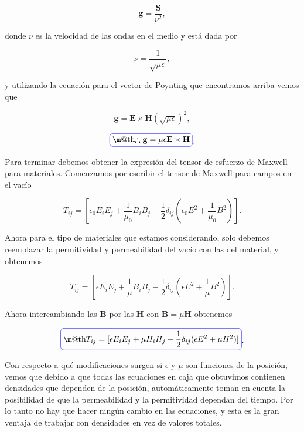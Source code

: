 \documentclass[a4paper,11pt]{article}
\makeatletter
\numberwithin{equation}{section}
\newcommand*{\boxcolor}{blue}
\renewcommand{\boxed}[1]{\textcolor{\boxcolor}{%
\tikz[baseline={([yshift=-1ex]current bounding box.center)}] \node [rectangle, minimum width=1ex,rounded corners,draw] {\normalcolor\m@th$\displaystyle#1$};}}
\makeatother
\begin{document}
\begin{equation}
 \mathbf{g} = \frac{\mathbf{S}}{\nu^2},
\end{equation}

donde $\nu$ es la velocidad de las ondas en el medio y está dada por 

\begin{equation}
 \nu = \frac{1}{\sqrt{\mu\epsilon}},
\end{equation}

y utilizando la ecuación para el vector de Poynting que encontramos arriba vemos que 

\begin{equation}
 \mathbf{g} = \mathbf{E} \times \mathbf{H}(\sqrt{\mu\epsilon})^2,
\end{equation}

\begin{equation}
 \boxed{\therefore \mathbf{g} = \mu\epsilon\mathbf{E} \times \mathbf{H}}.
\end{equation}

Para terminar debemos obtener la expresión del tensor de esfuerzo de Maxwell 
para materiales. Comenzamos por escribir el tensor de Maxwell para campos 
en el vacío 

\begin{equation}
 T_{ij} = \left[\epsilon_0 E_iE_j + \frac{1}{\mu_0} B_iB_j - \frac{1}{2}\delta_{ij}\left(\epsilon_0 E^2 + 
 \frac{1}{\mu_0} B^2\right)\right].
\end{equation}

Ahora para el tipo de materiales que estamos considerando, solo debemos reemplazar 
la permitividad y permeabilidad del vacío con las del material, y obtenemos 

\begin{equation}
 T_{ij} = \left[\epsilon E_iE_j + \frac{1}{\mu} B_iB_j - \frac{1}{2}\delta_{ij}\left(\epsilon E^2 + 
 \frac{1}{\mu} B^2\right)\right].
\end{equation}

Ahora intercambiando las $\mathbf{B}$ por las $\mathbf{H}$ con $\mathbf{B} = \mu 
\mathbf{H}$ obtenemos 

\begin{equation}
 \boxed{T_{ij} = [\epsilon E_iE_j + \mu H_iH_j - \frac{1}{2}\delta_{ij}(\epsilon E^2 + \mu H^2)]}.
\end{equation}

Con respecto a qué modificaciones surgen si $\epsilon$ y $\mu$ son funciones de la 
posición, vemos que debido a que todas las ecuaciones en caja que obtuvimos contienen 
densidades que dependen de la posición, automáticamente toman en cuenta la posibilidad 
de que la permeabilidad y la permitividad dependan del tiempo. Por lo tanto 
no hay que hacer ningún cambio en las ecuaciones, y esta es la gran ventaja de 
trabajar con densidades en vez de valores totales.
\end{document}

